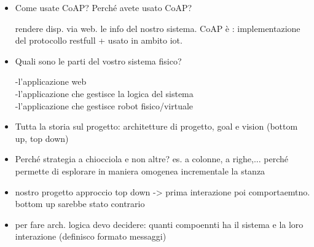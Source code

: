 \begin{itemize}
\item Come usate CoAP? Perché avete usato CoAP?

rendere disp. via web. le info del nostro sistema. CoAP è : implementazione del protocollo restfull + usato in ambito iot.

\item Quali sono le parti del vostro sistema fisico?

-l'applicazione web\\
-l'applicazione che gestisce la logica del sistema\\
-l'applicazione che gestisce robot fisico/virtuale\\


\item  Tutta la storia sul progetto: architetture di progetto, goal e vision (bottom up, top down)

\item Perché strategia a chiocciola e non altre? es. a colonne, a righe,...
perché permette di esplorare in maniera omogenea incrementale la stanza 

\item nostro progetto approccio top down -> prima interazione poi comportaemtno. bottom up sarebbe stato contrario

\item per fare arch. logica devo decidere: quanti compoennti ha il sistema e la loro interazione (definisco formato messaggi)
\end{itemize}
